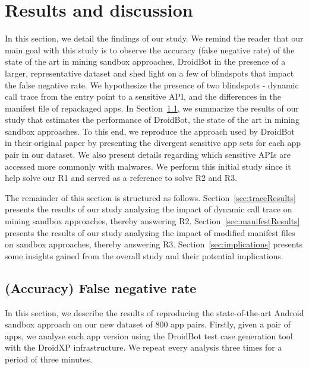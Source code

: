 \section{Results and discussion}\label{sec:results}



In this section, we detail the findings of our study.  We remind the reader that our main goal with this study is to observe the accuracy (false negative rate) of the state of the art in mining sandbox approaches, DroidBot in the presence of a larger, representative dataset and shed light on a few of blindspots that impact the false negative rate. We hypothesize the presence of two blindspots - dynamic call trace from the entry point to a sensitive API, and the differences in the manifest file of repackaged apps. In Section~\ref{sec:Sensitive APIs}, we summarize the results of our study that estimates the performance of DroidBot, the state of the art in mining sandbox approaches. To this end, we reproduce the approach used by DroidBot in their original paper by presenting the divergent sensitive app sets for each app pair in our dataset. We also present details regarding which sensitive APIs are accessed more commonly with malwares. 
We perform this initial study since it help solve our R1 and served as a reference to solve R2 and R3. 

The remainder of this section is structured as follows. Section~\ref{sec:traceResults} presents the results of our study analyzing the impact of dynamic call trace on mining sandbox approaches, thereby answering R2. Section~\ref{sec:manifestResults} presents the results of our study analyzing the impact of modified manifest files on sandbox approaches, thereby answering R3. Section~\ref{sec:implications} presents some insights gained from the overall study and their potential implications.

\subsection{(Accuracy) False negative rate}\label{sec:Sensitive APIs}

In this section, we describe the results of reproducing the state-of-the-art Android sandbox approach on our new dataset of $800$ app pairs.
Firstly, given a pair of apps, we analyse each app version using the DroidBot test case generation tool with the DroidXP infrastructure. We repeat
every analysis three times for a period of three minutes.

